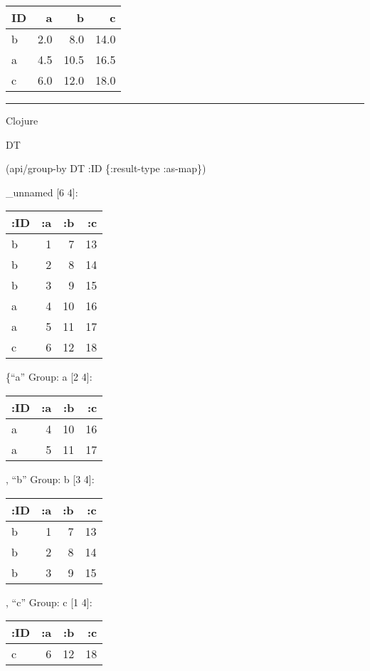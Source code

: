 \documentclass[]{article}
\newenvironment{Shaded}{\begin{snugshade}}{\end{snugshade}}
\newcommand{\AttributeTok}[1]{\textcolor[rgb]{0.77,0.63,0.00}{#1}}
\newcommand{\NormalTok}[1]{#1}
\begin{document}
\begin{longtable}[]{@{}lrrr@{}}
\toprule
ID & a & b & c\tabularnewline
\midrule
\endhead
b & 2.0 & 8.0 & 14.0\tabularnewline
a & 4.5 & 10.5 & 16.5\tabularnewline
c & 6.0 & 12.0 & 18.0\tabularnewline
\bottomrule
\end{longtable}

\begin{center}\rule{0.5\linewidth}{0.5pt}\end{center}

Clojure

\begin{Shaded}
\begin{Highlighting}[]
\NormalTok{DT}

\NormalTok{(api/group-by DT }\AttributeTok{:ID}\NormalTok{ \{}\AttributeTok{:result-type} \AttributeTok{:as-map}\NormalTok{\})}
\end{Highlighting}
\end{Shaded}

\_unnamed {[}6 4{]}:

\begin{longtable}[]{@{}lrrr@{}}
\toprule
:ID & :a & :b & :c\tabularnewline
\midrule
\endhead
b & 1 & 7 & 13\tabularnewline
b & 2 & 8 & 14\tabularnewline
b & 3 & 9 & 15\tabularnewline
a & 4 & 10 & 16\tabularnewline
a & 5 & 11 & 17\tabularnewline
c & 6 & 12 & 18\tabularnewline
\bottomrule
\end{longtable}

\{``a'' Group: a {[}2 4{]}:

\begin{longtable}[]{@{}lrrr@{}}
\toprule
:ID & :a & :b & :c\tabularnewline
\midrule
\endhead
a & 4 & 10 & 16\tabularnewline
a & 5 & 11 & 17\tabularnewline
\bottomrule
\end{longtable}

, ``b'' Group: b {[}3 4{]}:

\begin{longtable}[]{@{}lrrr@{}}
\toprule
:ID & :a & :b & :c\tabularnewline
\midrule
\endhead
b & 1 & 7 & 13\tabularnewline
b & 2 & 8 & 14\tabularnewline
b & 3 & 9 & 15\tabularnewline
\bottomrule
\end{longtable}

, ``c'' Group: c {[}1 4{]}:

\begin{longtable}[]{@{}lrrr@{}}
\toprule
:ID & :a & :b & :c\tabularnewline
\midrule
\endhead
c & 6 & 12 & 18\tabularnewline
\bottomrule
\end{longtable}
\end{document}

